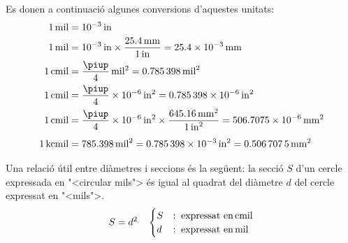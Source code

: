   Es donen a continuaci\'{o} algunes conversions d'aquestes unitats:
\begin{align}
   \SI{1}{mil} &= \SI{e-3}{in}  \\
  \SI{1}{mil} &= \SI{e-3}{in} \times \frac{\SI{25,4}{mm}}{\SI{1}{in}} = \SI{25,4e-3}{mm}  \\
  \SI{1}{cmil} &= \frac{\piup}{4}\unit{mil^2} = \SI{0,785398}{mil^2}   \\
   \SI{1}{cmil} &= \frac{\piup}{4}\times \SI{e-6}{in^2} = \SI{0,785398e-6}{in^2} \\
   \SI{1}{cmil} &= \frac{\piup}{4} \times \SI{e-6}{in^2} \times \frac{\SI{645,16}{mm^2}}{\SI{1}{in^2}} = \SI{506,7075e-6}{mm^2}
   \\[1ex]
   \SI{1}{kcmil} &= \SI{785,398}{mil^2}  = \SI{0,785398e-3}{in^2} = \SI{0,5067075}{mm^2}
\end{align}

Una relaci\'{o} \'{u}til entre di\`{a}metres  i seccions \'{e}s la seg\"{u}ent: la secci\'{o} $S$ d'un cercle expressada en {"<}circular mils{">} \'{e}s igual al quadrat del di\`{a}metre $d$ del cercle expressat en {"<}mils{">}.
\begin{equation}
   S = d^2 \quad
   \begin{cases}
   S &:\; \text{expressat en\ensuremath{\mathrm{\,cmil}}} \\
   d &:\; \text{expressat en\ensuremath{\mathrm{\,mil}}}
   \end{cases}
\end{equation}

